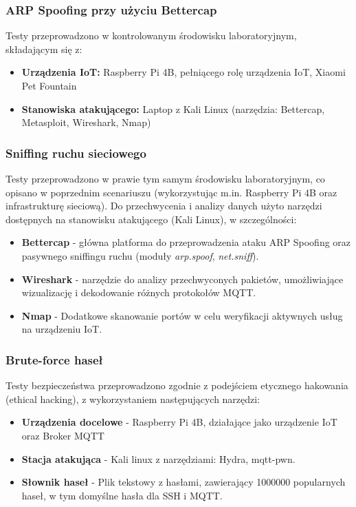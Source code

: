 \subsubsection{ARP Spoofing przy użyciu Bettercap}
Testy przeprowadzono w kontrolowanym środowisku laboratoryjnym, składającym się z:
\begin{itemize}
    \item \textbf{Urządzenia IoT:} Raspberry Pi 4B, pełniącego rolę urządzenia IoT, Xiaomi Pet Fountain
    \item \textbf{Stanowiska atakującego: } Laptop z Kali Linux (narzędzia: Bettercap, Metasploit, Wireshark, Nmap) 
\end{itemize}

\subsubsection{Sniffing ruchu sieciowego}
Testy przeprowadzono w prawie tym samym środowisku laboratoryjnym, co opisano w poprzednim scenariuszu (wykorzystując m.in. Raspberry Pi 4B oraz infrastrukturę sieciową). Do przechwycenia i analizy danych użyto narzędzi dostępnych na stanowisku atakującego (Kali Linux), w szczególności:
\begin{itemize}
    \item \textbf{Bettercap} - główna platforma do przeprowadzenia ataku ARP Spoofing oraz pasywnego sniffingu ruchu (moduły \textit{arp.spoof}, \textit{net.sniff}).
    \item \textbf{Wireshark} - narzędzie do analizy przechwyconych pakietów, umożliwiające wizualizację i dekodowanie różnych protokołów MQTT.
    \item \textbf{Nmap} - Dodatkowe skanowanie portów w celu weryfikacji aktywnych usług na urządzeniu IoT.
\end{itemize}

\subsubsection{Brute-force haseł}
Testy bezpieczeństwa przeprowadzono zgodnie z podejściem etycznego hakowania (ethical hacking), z wykorzystaniem następujących narzędzi:
\begin{itemize}
    \item \textbf{Urządzenia docelowe} - Raspberry Pi 4B, działające jako urządzenie IoT oraz Broker MQTT
    \item \textbf{Stacja atakująca} - Kali linux z narzędziami: Hydra, mqtt-pwn.
    \item \textbf{Słownik haseł} - Plik tekstowy z hasłami, zawierający 1000000 popularnych haseł, w tym domyślne hasła dla SSH i MQTT. 
\end{itemize}

